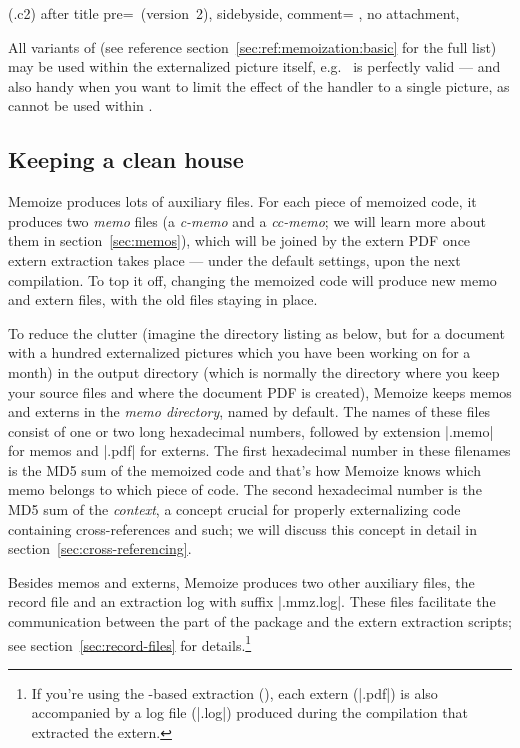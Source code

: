 \documentclass[a4paper,11pt]{article}
\begin{document}
(.c2){
  after title pre={\ (version~2)},
  sidebyside,
  comment={\centering
  },
  no attachment,
}

All variants of  (see reference
section~\ref{sec:ref:memoization:basic} for the full list) may be used within
the externalized picture itself, e.g.\  is perfectly
valid --- and also handy when you want to limit the effect of the handler to a
single picture, as  cannot be used within
.



\subsection{Keeping a clean house}
\label{sec:tut:memodir}

Memoize produces lots of auxiliary files.  For each piece of memoized code, it
produces two \emph{memo} files (a \emph{c-memo} and a \emph{cc-memo}; we will
learn more about them in section~\ref{sec:memos}), which will be joined by the
extern PDF once extern extraction takes place --- under the default settings,
upon the next compilation.  To top it off, changing the memoized code will
produce new memo and extern files, with the old files staying in place.

To reduce the clutter (imagine the directory listing as below, but for a
document with a hundred externalized pictures which you have been working on
for a month) in the output directory (which is normally the directory where you
keep your source files and where the document PDF is created), Memoize keeps
memos and externs in the \emph{memo directory}, named  by default.  The names of these files consist of one or two
long hexadecimal numbers, followed by extension |.memo| for memos and |.pdf|
for externs.  The first hexadecimal number in these filenames is the MD5 sum of
the memoized code and that's how Memoize knows which memo belongs to which
piece of code.  The second hexadecimal number is the MD5 sum of the
\emph{context}, a concept crucial for properly externalizing code containing
cross-references and such; we will discuss this concept in detail in
section~\ref{sec:cross-referencing}.

Besides memos and externs, Memoize produces two other auxiliary files, the
\dmmz record file and an extraction log with suffix |.mmz.log|.  These files
facilitate the communication between the  part of the package and
the extern extraction scripts; see section~\ref{sec:record-files} for
details.\cprotect\footnote{If you're using the -based extraction
  (), each extern (|.pdf|) is also
  accompanied by a  log file (|.log|) produced during the
  compilation that extracted the extern.}
\end{document}
